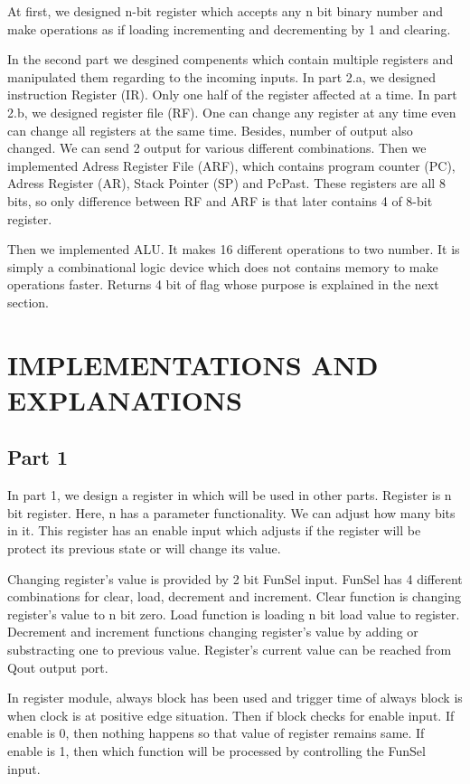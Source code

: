 \documentclass[pdftex,12pt,a4paper]{article}
\begin{document}
At first, we designed n-bit register which accepts any n bit binary number and make
operations as if loading incrementing and decrementing by 1 and clearing.

In the second part we desgined compenents which contain multiple registers and 
manipulated them regarding to the incoming inputs. In part 2.a, we designed
instruction Register (IR). Only one half of the register affected at a time.
In part 2.b,  we designed register file (RF). One can change any register at any time even can 
change all registers at the same time. Besides, number of output also changed. We can send
2 output for various different combinations. Then we implemented Adress Register File (ARF),
which contains program counter (PC), Adress Register (AR), Stack Pointer (SP) and PcPast.
These registers are all 8 bits, so only difference between RF and ARF is that later contains
4 of 8-bit register.  

Then we implemented ALU. It makes 16 different operations to two number. It is simply a 
combinational logic device which does not contains memory to make operations faster.
Returns 4 bit of flag whose purpose is explained in the next section.




\section{IMPLEMENTATIONS AND EXPLANATIONS }
\subsection{Part 1}
In part 1, we design a register in which will be used in other parts. Register
is n bit register. Here, n has a parameter functionality. We can adjust 
how many bits in it. This register has an enable input which adjusts 
if the register will be protect
its previous state or will change its value. 

Changing register's value is
provided by 2 bit FunSel input. FunSel has 4 different combinations for clear,
load, decrement and increment. Clear function is changing register's value to
n bit zero. Load function is loading n bit load value to register. Decrement and
increment functions changing register's value by adding or substracting one to 
previous value. Register's current value can be reached from Qout output port.

In register module, always block has been used and trigger time of always block
is when clock is at positive edge situation. Then if block checks for enable input.
If enable is 0, then nothing happens so that value of register remains same. If
enable is 1, then which function will be processed by controlling the FunSel input.
\end{document}

